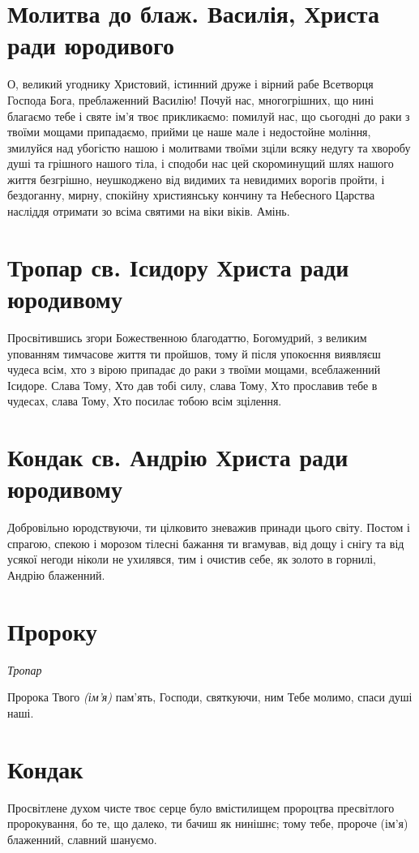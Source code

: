 \documentclass[chapters.tex]{subfiles}
\begin{document}
\section{Молитва до блаж. Василія, Христа ради юродивого}
О, великий угоднику Христовий, істинний друже і вірний рабе Всетворця Господа Бога, преблаженний Василію! Почуй нас, многогрішних, що нині благаємо тебе і святе ім’я твоє прикликаємо: помилуй нас, що сьогодні до раки з твоїми мощами припадаємо, прийми це наше мале і недостойне моління, змилуйся над убогістю нашою і молитвами твоїми зціли всяку недугу та хворобу душі та грішного нашого тіла, і сподоби нас цей скороминущий шлях нашого життя безгрішно, неушкоджено від видимих та невидимих ворогів пройти, і бездоганну, мирну, спокійну християнську кончину та Небесного Царства насліддя отримати зо всіма святими на віки віків. Амінь.

\section{Тропар св. Ісидору Христа ради юродивому}
Просвітившись згори Божественною благодаттю, Богомудрий, з великим упованням тимчасове життя ти пройшов, тому й після упокоєння виявляєш чудеса всім, хто з вірою припадає до раки з твоїми мощами, всеблаженний Ісидоре. Слава Тому, Хто дав тобі силу, слава Тому, Хто прославив тебе в чудесах, слава Тому, Хто посилає тобою всім зцілення.

\section{Кондак св. Андрію Христа ради юродивому}
Добровільно юродствуючи, ти цілковито зневажив принади цього світу. Постом і спрагою, спекою і морозом тілесні бажання ти вгамував, від дощу і снігу та від усякої негоди ніколи не ухилявся, тим і очистив себе, як золото в горнилі, Андрію блаженний.

\section{Пророку}
\emph{Тропар}

Пророка Твого \emph{(ім’я)} пам’ять, Господи, святкуючи, ним Тебе молимо, спаси душі наші.

\section{Кондак}

Просвітлене духом чисте твоє серце було вмістилищем пророцтва пресвітлого пророкування, бо те, що далеко, ти бачиш як нинішнє; тому тебе, пророче (ім’я) блаженний, славний шануємо.
\end{document}
